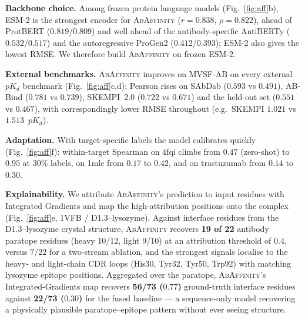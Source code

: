 \documentclass{article}
\newcommand{\pkd}{\ensuremath{pK_d}}
\newcommand{\model}{\textsc{AbAffinity}}
\begin{document}
\textbf{Backbone choice.} Among frozen protein language models (Fig.~\ref{fig:aff}b), ESM-2 is the
strongest encoder for \model{} ($r=0.838$, $\rho=0.822$), ahead of ProtBERT ($0.819$/$0.809$) and well
ahead of the antibody-specific AntiBERTy ($0.532$/$0.517$) and the autoregressive ProGen2
($0.412$/$0.393$); ESM-2 also gives the lowest RMSE. We therefore build \model{} on frozen ESM-2.

\textbf{External benchmarks.} \model{} improves on MVSF-AB on every external \pkd{} benchmark
(Fig.~\ref{fig:aff}c,d): Pearson rises on SAbDab ($0.593$ vs $0.491$), AB-Bind ($0.781$ vs $0.739$),
SKEMPI~2.0 ($0.722$ vs $0.671$) and the held-out set ($0.551$ vs $0.467$), with correspondingly lower RMSE
throughout (e.g.\ SKEMPI $1.021$ vs $1.513$~\pkd{}).

\textbf{Adaptation.} With target-specific labels the model calibrates quickly (Fig.~\ref{fig:aff}f):
within-target Spearman on 4fqi climbs from $0.47$ (zero-shot) to $0.95$ at 30\% labels, on 1mlc from $0.17$
to $0.42$, and on trastuzumab from $0.14$ to $0.30$.

\textbf{Explainability.} We attribute \model{}'s prediction to input residues with Integrated Gradients and
map the high-attribution positions onto the complex (Fig.~\ref{fig:aff}e, 1VFB / D1.3--lysozyme). Against
interface residues from the D1.3--lysozyme crystal structure, \model{} recovers \textbf{19 of 22} antibody
paratope residues (heavy 10/12, light 9/10) at an attribution threshold of $0.4$, versus $7/22$ for a
two-stream ablation, and the strongest signals localise to the heavy- and light-chain CDR loops (His30,
Tyr32, Tyr50, Trp92) with matching lysozyme epitope positions. Aggregated over the paratope, \model{}'s
Integrated-Gradients map recovers \textbf{56/73 ($0.77$)} ground-truth interface residues against
\textbf{22/73 ($0.30$)} for the fused baseline --- a sequence-only model recovering a physically plausible
paratope--epitope pattern without ever seeing structure.
\end{document}
